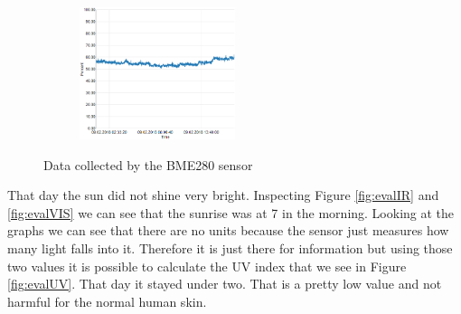 \documentclass[bachelorthesis, grey, english]{mas-thesis-chapters} %
\begin{document}
\begin{figure}
\begin{subfigure}[c]{0.5\textwidth}
\label{fig:evalHum}
\end{subfigure}
\par\medskip
\begin{subfigure}[c]{\textwidth}
\centering
\includegraphics[width=0.5\textwidth]{expEval/Hum_09-02-2018.PNG}
\label{fig:evalPres}
\end{subfigure}
\caption{Data collected by the BME280 sensor}
\end{figure}

That day the sun did not shine very bright. Inspecting Figure \ref{fig:evalIR} and \ref{fig:evalVIS} we can see that the sunrise was at 7 in the morning. Looking at the graphs we can see that there are no units because the sensor just measures how many light falls into it. Therefore it is just there for information but using those two values it is possible to calculate the \gls{UV} index that we see in Figure \ref{fig:evalUV}. That day it stayed under two. That is a pretty low value and not harmful for the normal human skin. 
\end{document}
